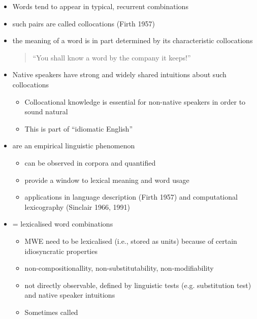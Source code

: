 \documentclass[a4paper,landscape,headrule,footrule,xetex]{foils}
\begin{document}


\begin{itemize}
\item Words tend to appear in typical, recurrent combinations
\item such pairs are called collocations (Firth 1957)
\item the meaning of a word is in part determined by its
characteristic collocations
\begin{quote}
``You shall know a word by the company it keeps!''
\end{quote}
\item Native speakers have strong and widely shared intuitions
about such collocations
\begin{itemize}
\item Collocational knowledge is essential for non-native
speakers in order to sound natural
\item This is part of ``idiomatic English''
\end{itemize}
\end{itemize}


\begin{itemize}
\item {} are an empirical linguistic phenomenon
\begin{itemize}
\item can be observed in corpora and quantified
\item provide a window to lexical meaning and word usage
\item applications in language description (Firth 1957) and
computational lexicography (Sinclair 1966, 1991)
\end{itemize}
\item {} = lexicalised word combinations
\begin{itemize}
\item MWE need to be lexicalised (i.e., stored as units) because
of certain idiosyncratic properties
\item non-compositionallity, non-substitutability, non-modifiability
  \citep{Manning:Schuetze:1999}
\item not directly observable, defined by linguistic tests
(e.g. substitution test) and native speaker intuitions
\item Sometimes called  
\end{itemize}
\end{itemize}
\end{document}
